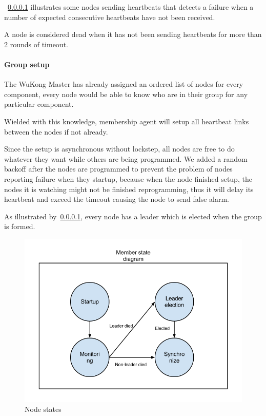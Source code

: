 ~\ref{} illustrates some nodes sending heartbeats that detects
a failure when a number of expected consecutive heartbeats have not been
received.


A node is considered dead when it has not been sending heartbeats for more 
than 2 rounds of timeout.

\paragraph{Group setup}

The WuKong Master has already assigned an ordered list of nodes for every component,
every node would be able to know who are in their group for any particular
component.

Wielded with this knowledge, membership agent will setup all heartbeat links
between the nodes if not already.

Since the setup is asynchronous without lockstep, all nodes are free to do
whatever they want while others are being programmed. We added a random backoff
after the nodes are programmed to prevent the problem of nodes reporting 
failure when they startup, because when the node finished setup, the nodes it
is watching might not be finished reprogramming, thus it will delay its
heartbeat and exceed the timeout causing the node to send false alarm.

As illustrated by~\ref{}, every node has a leader which is elected when the
group is formed.

\begin{figure}[h!]
\caption{Node states}
\centering
    \includegraphics[width=\linewidth]{figures/node-states}
\end{figure}

